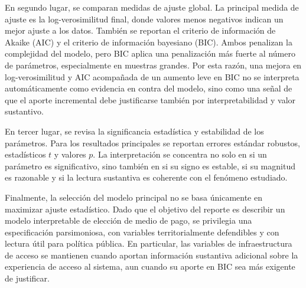 En segundo lugar, se comparan medidas de ajuste global. La principal medida de ajuste es la log-verosimilitud final, donde valores menos negativos indican un mejor ajuste a los datos. También se reportan el criterio de información de Akaike (AIC) y el criterio de información bayesiano (BIC). Ambos penalizan la complejidad del modelo, pero BIC aplica una penalización más fuerte al número de parámetros, especialmente en muestras grandes. Por esta razón, una mejora en log-verosimilitud y AIC acompañada de un aumento leve en BIC no se interpreta automáticamente como evidencia en contra del modelo, sino como una señal de que el aporte incremental debe justificarse también por interpretabilidad y valor sustantivo.

En tercer lugar, se revisa la significancia estadística y estabilidad de los parámetros. Para los resultados principales se reportan errores estándar robustos, estadísticos \(t\) y valores \(p\). La interpretación se concentra no solo en si un parámetro es significativo, sino también en si su signo es estable, si su magnitud es razonable y si la lectura sustantiva es coherente con el fenómeno estudiado.

Finalmente, la selección del modelo principal no se basa únicamente en maximizar ajuste estadístico. Dado que el objetivo del reporte es describir un modelo interpretable de elección de medio de pago, se privilegia una especificación parsimoniosa, con variables territorialmente defendibles y con lectura útil para política pública. En particular, las variables de infraestructura de acceso se mantienen cuando aportan información sustantiva adicional sobre la experiencia de acceso al sistema, aun cuando su aporte en BIC sea más exigente de justificar.
